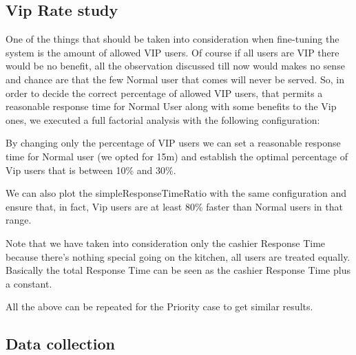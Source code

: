 \subsection{Vip Rate study}

One of the things that should be taken into consideration when fine-tuning the system is the amount of allowed VIP users. Of course if all users are VIP there would be no benefit, all the observation discussed till now would makes no sense and chance are that the few Normal user that comes will never be served. So, in order to decide the correct percentage of allowed VIP users, that permits a reasonable response time for Normal User along with some benefits to the Vip ones, we executed a full factorial analysis with the following configuration:
 

 By changing only the percentage of VIP users we can set a reasonable response time for Normal user (we opted for 15m) and establish the optimal percentage of Vip users that is between 10\% and 30\%.


 We can also plot the simpleResponseTimeRatio with the same configuration and ensure that, in fact, Vip users are at least 80\% faster than Normal users in that range.


 Note that we have taken into consideration only the cashier Response Time because there's nothing special going on the kitchen, all users are treated equally. Basically the total Response Time can be seen as the cashier Response Time plus a constant. %


All the above can be repeated for the Priority case to get similar results.






\subsection{Data collection}